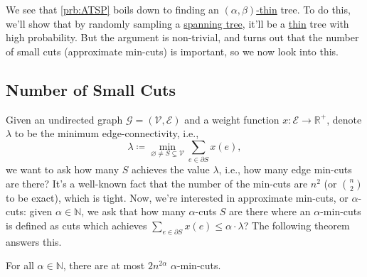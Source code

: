 We see that \autoref{prb:ATSP} boils down to finding an \hyperref[def:thin]{\((\alpha , \beta )\)-thin} tree. To do this, we'll show that by randomly sampling a \hyperref[def:spanning-tree]{spanning tree}, it'll be a \hyperref[def:thin]{thin} tree with high probability. But the argument is non-trivial, and turns out that the number of small cuts (approximate min-cuts) is important, so we now look into this.

\subsection{Number of Small Cuts}
Given an undirected graph \(\mathcal{G} =(\mathcal{V} , \mathcal{E} )\) and a weight function \(x\colon \mathcal{E} \to \mathbb{R} ^+\), denote \(\lambda \) to be the minimum edge-connectivity, i.e.,
\[
	\lambda \coloneqq \min _{\varnothing \neq S \subsetneq \mathcal{V} } \sum_{e\in \partial S} x(e),
\]
we want to ask how many \(S\) achieves the value \(\lambda \), i.e., how many edge min-cuts are there? It's a well-known fact that the number of the min-cuts are \(n^2\) (or \(\binom{n}{2}\) to be exact), which is tight. Now, we're interested in approximate min-cuts, or \(\alpha\)-cuts: given \(\alpha \in \mathbb{N} \), we ask that how many \(\alpha \)-cuts \(S\) are there where an \(\alpha \)-min-cuts is defined as cuts which achieves \(\sum_{e\in \partial S} x(e) \leq \alpha \cdot \lambda \)? The following theorem answers this.

\begin{theorem}\label{thm:num-small-min-cuts}
	For all \(\alpha \in \mathbb{N} \), there are at most \(2n^{2\alpha }\) \(\alpha\)-min-cuts.
\end{theorem}